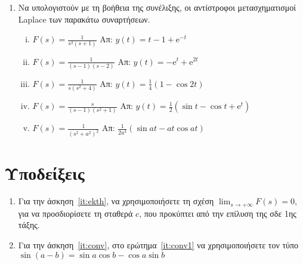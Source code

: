 \begin{enumerate}
    \item\label{it:conv} 
      Να υπολογιστούν με τη βοήθεια της συνέλιξης, οι αντίστροφοι μετασχηματισμοί 
      Laplace των παρακάτω συναρτήσεων.
      \begin{enumerate}[i)]
        \item $ F(s) = \frac{1}{s^{2}(s+1)} $ \hfill Απ: $ y(t) = t-1+ \mathrm{e}^{-t} $ 
        \item $ F(s) = \frac{1}{(s-1)(s-2)} $ \hfill Απ: $ y(t) = - \mathrm{e}^{t} +
          \mathrm{e}^{2t} $ 
        \item $ F(s) = \frac{1}{s(s^{2}+4)} $ \hfill Απ: $ y(t) = \frac{1}{4} (1-
          \cos{2t}) $ 
        \item $ F(s) = \frac{s}{(s-1)(s^{2}+1)} $ \hfill Απ: $ y(t) = \frac{1}{2}
          (\sin{t} - \cos{t} + \mathrm{e}^{t}) $  
        \item\label{it:conv1} 
          $ F(s) = \frac{1}{(s^{2}+a^{2})^{2}} $ \hfill Απ: $ \frac{1}{2a^{3}} 
          (\sin{at} - at \cos{at}) $ 
      \end{enumerate}

      \end{enumerate}

      \vspace{\baselineskip}

      \section*{Υποδείξεις}

      \begin{enumerate}
        \item Για την άσκηση~\ref{it:ekth}, να χρησιμοποιήσετε τη σχέση
          $ \lim\nolimits_{s\to+\infty}F(s)=0 $, για να προσδιορίσετε τη σταθερά $c$, που 
          προκύπτει από την επίλυση της σδε 1ης τάξης.
        \item Για την άσκηση~\ref{it:conv}, στο ερώτημα~\ref{it:conv1} να χρησιμοποιήσετε
          τον τύπο $ \sin{(a-b)} = \sin{a} \cos{b} - \cos{a} \sin{b} $ 
      \end{enumerate}


            

